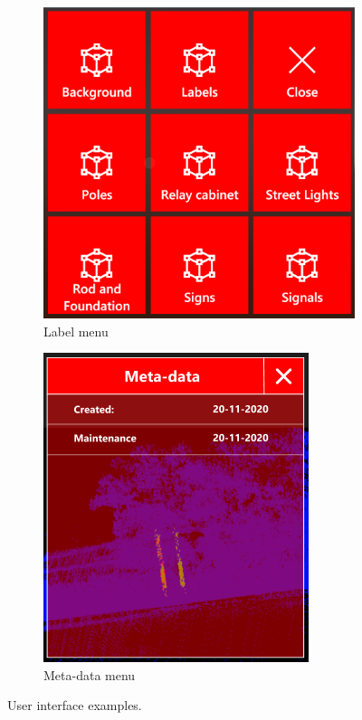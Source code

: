 \begin{figure}[!ht]
\begin{subfigure}{0.3\textwidth}
        \includegraphics[width=\textwidth]{./Chapters/immvis/figs/Strukton_label-menu.png}
        \caption{Label menu}
    \end{subfigure}%
    \hfill
    \begin{subfigure}{0.3\textwidth}
        \includegraphics[width=\textwidth]{./Chapters/immvis/figs/Strukton_meta-data.png}
        \caption{Meta-data menu}
    \end{subfigure}%
    \caption{User interface examples.} 
    \label{fig:immvis:ui}
\end{figure}

